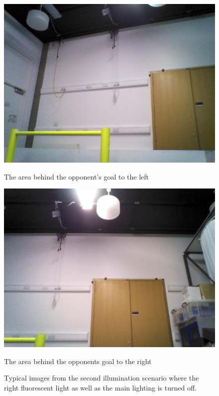\begin{figure}
\begin{minipage}[b]{0.5\linewidth}
\includegraphics[scale=0.3]{../Drawings/lighting/rightLight/3.jpg}
\caption{The area behind the opponent's goal to the left}
\label{fig:rightogleft}
\end{minipage}
\hspace{0.5cm}
\begin{minipage}[b]{0.5\linewidth}
\includegraphics[scale=0.3]{../Drawings/lighting/rightLight/4.jpg}
\caption{The area behind the opponents goal to the right}
\label{fig:rightogright}
\end{minipage}
\caption{Typical images from the second illumination scenario where the right fluorescent light as well as the main lighting is turned off.}
\end{figure}



